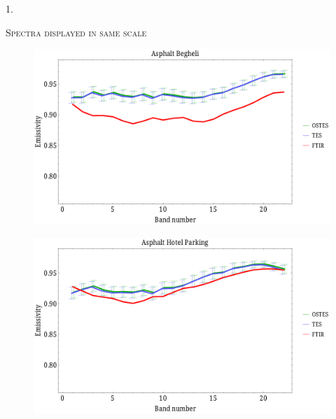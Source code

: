 \documentclass[xcolor=dvipsnames]{beamer}
\begin{document}
\begin{frame}[plain]{}
	\begin{center}
		\Huge\textsc{\Huge 1.}

		\textsc{\huge Spectra displayed in same scale}
	\end{center}
\end{frame}

\begin{frame}[plain]{}
\begin{figure}[htb]
	\centering
	\includegraphics[scale=0.35]{AsphaltBegheli.pdf}
\end{figure}
\end{frame}

\begin{frame}[plain]{}
\begin{figure}[htb]
	\centering
	\includegraphics[scale=0.35]{AsphaltHotelParking.pdf}
\end{figure}
\end{frame}
\end{document}
